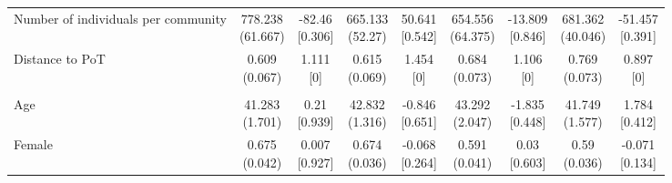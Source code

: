 {\begin{tabular}[t]{lcccccccc}
\hspace{1em}Number of individuals per community & \makecell[c]{778.238\\(61.667)} & \makecell[c]{-82.46\\{[0.306]}} & \makecell[c]{665.133\\(52.27)} & \makecell[c]{50.641\\{[0.542]}} & \makecell[c]{654.556\\(64.375)} & \makecell[c]{-13.809\\{[0.846]}} & \makecell[c]{681.362\\(40.046)} & \makecell[c]{-51.457\\{[0.391]}}\\
\hspace{1em}Distance to PoT & \makecell[c]{0.609\\(0.067)} & \makecell[c]{1.111\\{[0]}} & \makecell[c]{0.615\\(0.069)} & \makecell[c]{1.454\\{[0]}} & \makecell[c]{0.684\\(0.073)} & \makecell[c]{1.106\\{[0]}} & \makecell[c]{0.769\\(0.073)} & \makecell[c]{0.897\\{[0]}}\\
\addlinespace[0.3em]
\hline
\multicolumn{9}{l}{\textit{\textbf{Panel B: Endline observability sample, $N=1,141$}}}\\
\hline
\hspace{1em}Age & \makecell[c]{41.283\\(1.701)} & \makecell[c]{0.21\\{[0.939]}} & \makecell[c]{42.832\\(1.316)} & \makecell[c]{-0.846\\{[0.651]}} & \makecell[c]{43.292\\(2.047)} & \makecell[c]{-1.835\\{[0.448]}} & \makecell[c]{41.749\\(1.577)} & \makecell[c]{1.784\\{[0.412]}}\\
\hspace{1em}Female & \makecell[c]{0.675\\(0.042)} & \makecell[c]{0.007\\{[0.927]}} & \makecell[c]{0.674\\(0.036)} & \makecell[c]{-0.068\\{[0.264]}} & \makecell[c]{0.591\\(0.041)} & \makecell[c]{0.03\\{[0.603]}} & \makecell[c]{0.59\\(0.036)} & \makecell[c]{-0.071\\{[0.134]}}\\

\end{tabular}}
